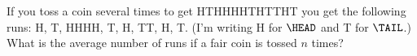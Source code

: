   If you toss a coin several times to get
  HTHHHHTHTTHT
  you get the following runs: H, T, HHHH, T, H, TT, H, T.
  (I'm writing H for $\HEAD$ and T for $\TAIL$.) 
  What is the average number of runs if a fair coin is tossed $n$ times?

